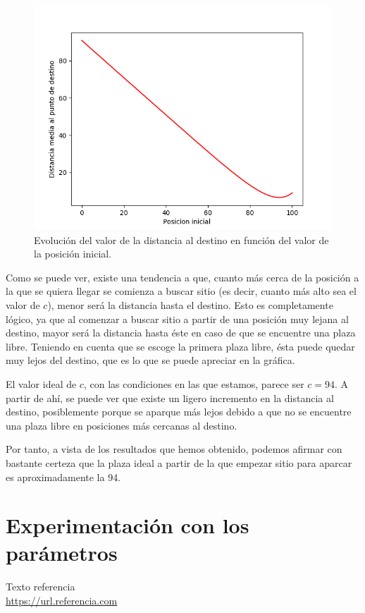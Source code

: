 \documentclass[11pt,a4paper]{report}
\begin{document}
\begin{figure}[H]
\centering
\includegraphics[scale=0.6]{img/c-dist.png}
\caption{Evolución del valor de la distancia al destino en función del valor de la posición inicial.}
\end{figure}

Como se puede ver, existe una tendencia a que, cuanto más cerca de la posición a la que se quiera llegar
se comienza a buscar sitio (es decir, cuanto más alto sea el valor de $c$), menor será la distancia hasta
el destino. Esto es completamente lógico, ya que al comenzar a buscar sitio a partir de una posición
muy lejana al destino, mayor será la distancia hasta éste en caso de que se encuentre una plaza libre. Teniendo
en cuenta que se escoge la primera plaza libre, ésta puede quedar muy lejos del destino, que es lo que se puede
apreciar en la gráfica.

El valor ideal de $c$, con las condiciones en las que estamos, parece ser $c = 94$. A partir de ahí, se puede ver
que existe un ligero incremento en la distancia al destino, posiblemente porque se aparque más lejos debido a que
no se encuentre una plaza libre en posiciones más cercanas al destino.

Por tanto, a vista de los resultados que hemos obtenido, podemos afirmar con bastante certeza que la plaza ideal
a partir de la que empezar sitio para aparcar es aproximadamente la 94.

\section{Experimentación con los parámetros}

\newpage

\begin{thebibliography}{5}

Texto referencia
\\\url{https://url.referencia.com}

\end{thebibliography}
\end{document}
